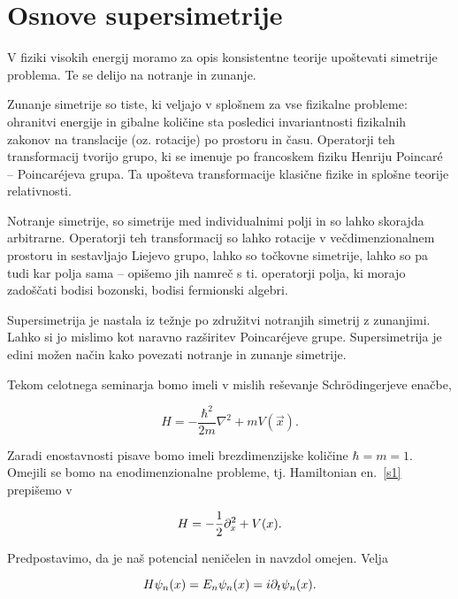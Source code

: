 \section{Osnove supersimetrije}

V fiziki visokih energij moramo za opis konsistentne teorije upo\v stevati simetrije problema. Te se delijo
na notranje in zunanje.

Zunanje simetrije so tiste, ki veljajo v splo\v snem za vse fizikalne probleme: ohranitvi
energije in gibalne koli\v cine sta posledici invariantnosti fizikalnih zakonov na translacije (oz. rotacije) po
prostoru in \v casu. Operatorji teh transformacij tvorijo grupo, ki se imenuje po francoskem fiziku Henriju Poincaré
-- Poincaréjeva grupa. Ta upo\v steva transformacije klasi\v cne fizike in splo\v sne teorije relativnosti.

Notranje simetrije, so simetrije med individualnimi polji in so lahko skorajda arbitrarne.
Operatorji teh transformacij so lahko rotacije v ve\v cdimenzionalnem prostoru in sestavljajo Liejevo
grupo, lahko so to\v ckovne simetrije, lahko so pa tudi kar polja sama -- opi\v semo jih
namre\v c s ti. operatorji polja, ki morajo zado\v s\v cati bodisi bozonski, bodisi fermionski algebri.

Supersimetrija je nastala iz te\v znje po zdru\v zitvi notranjih simetrij z zunanjimi. Lahko si jo mislimo kot
naravno raz\v siritev Poincaréjeve grupe. Supersimetrija je edini mo\v zen na\v cin kako povezati notranje in zunanje
simetrije.

Tekom celotnega seminarja bomo imeli v mislih re\v sevanje Schr\" odingerjeve ena\v cbe,

\begin{equation}
	H = -\frac{\hbar^2}{2m}\nabla^2 + mV(\vec{x}).
	\label{s1}
\end{equation}

\ni Zaradi enostavnosti pisave bomo imeli brezdimenzijske koli\v cine $\hbar = m = 1$.
Omejili se bomo na enodimenzionalne probleme, tj. Hamiltonian en.~\eqref{s1} prepi\v semo v

\begin{equation}
	H = -\frac{1}{2}\partial_x^2 + V(x).
	\label{sx}
\end{equation}

\ni Predpostavimo, da je na\v s potencial neni\v celen in navzdol omejen. Velja

\begin{equation}
	H\psi_n(x) = E_n\psi_n(x) = i\partial_t\psi_n(x).
\end{equation}

